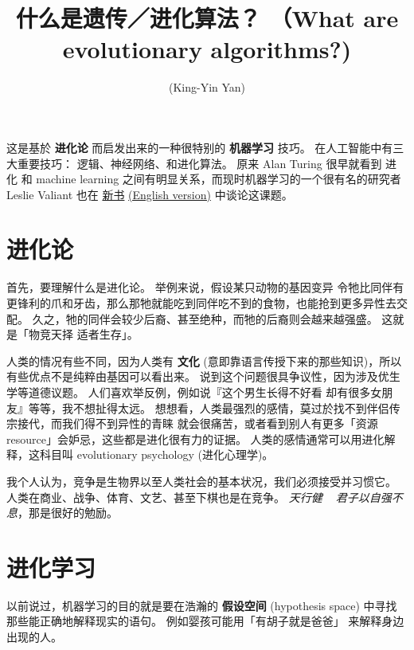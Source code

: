 \documentclass[orivec]{llncs}
\title{什么是遗传／进化算法？ （What are evolutionary algorithms?)}
\author{\usebox{\MyName} (King-Yin Yan)
}
\institute{General.Intelligence@Gmail.com}
\begin{document}
\maketitle
\setlength{\parindent}{0em}
\setlength{\parskip}{2.8ex}


这是基於 \textbf{进化论} 而启发出来的一种很特别的 \textbf{机器学习} 技巧。  在人工智能中有三大重要技巧： 逻辑、神经网络、和进化算法。   原来 Alan Turing 很早就看到 进化 和 machine learning 之间有明显关系，而现时机器学习的一个很有名的研究者 Leslie Valiant 也在 \href{http://book.douban.com/subject/20016696/}{新书} \href{http://www.amazon.com/Probably-Approximately-Correct-Algorithms-Prospering/dp/0465060722/ref=sr_1_1?ie=UTF8&qid=1426558262&sr=8-1&keywords=probably+approximately}{(English version)} 中谈论这课题。

\section{进化论}


首先，要理解什么是进化论。  举例来说，假设某只动物的基因变异 令牠比同伴有更锋利的爪和牙齿，那么那牠就能吃到同伴吃不到的食物，也能抢到更多异性去交配。  久之，牠的同伴会较少后裔、甚至绝种，而牠的后裔则会越来越强盛。  这就是「物竞天择 适者生存」。

人类的情况有些不同，因为人类有 \textbf{文化} (意即靠语言传授下来的那些知识)，所以有些优点不是纯粹由基因可以看出来。  说到这个问题很具争议性，因为涉及优生学等道德议题。  人们喜欢举反例，例如说『这个男生长得不好看 却有很多女朋友』等等，我不想扯得太远。  想想看，人类最强烈的感情，莫过於找不到伴侣传宗接代，而我们得不到异性的青睐 就会很痛苦，或者看到别人有更多「资源 resource」会妒忌，这些都是进化很有力的证据。 人类的感情通常可以用进化解释，这科目叫 evolutionary psychology (进化心理学)。

我个人认为，竞争是生物界以至人类社会的基本状况，我们必须接受并习惯它。  人类在商业、战争、体育、文艺、甚至下棋也是在竞争。   \textit{天行健 ~ 君子以自强不息}，那是很好的勉励。

\section{进化学习}

以前说过，机器学习的目的就是要在浩瀚的 \textbf{假设空间} (hypothesis space) 中寻找那些能正确地解释现实的语句。  例如婴孩可能用「有胡子就是爸爸」 来解释身边出现的人。
\end{document}
